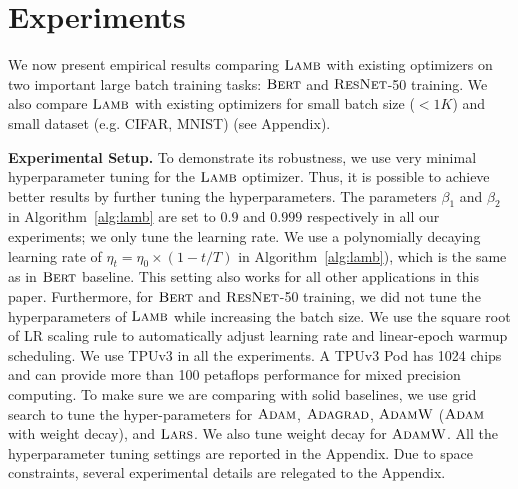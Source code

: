 \documentclass{article} \usepackage{iclr2020_conference,times}
\newcommand{\resnet}{\textsc{ResNet}}
\newcommand{\bert}{\textsc{Bert}\xspace}
\newcommand{\adagrad}{\textsc{Adagrad}}
\newcommand{\adam}{\textsc{Adam}}
\newcommand{\adamw}{\textsc{AdamW}}
\newcommand{\lamb}{\textsc{Lamb}}
\newcommand{\lars}{\textsc{Lars}}
\begin{document}
\section{Experiments}
\label{sec:experiments}
We now present empirical results comparing $\lamb$ with existing optimizers on two important large batch training tasks: $\bert$ and $\resnet$-50 training. 
We also compare $\lamb$ with existing optimizers for small batch size ($<1K$) and small dataset (e.g. CIFAR, MNIST) (see Appendix).

{\bf Experimental Setup. } To demonstrate its robustness, we use very minimal hyperparameter tuning for the $\lamb$ optimizer. Thus, it is possible to achieve better results by further tuning the hyperparameters. The parameters $\beta_1 $ and $\beta_2$ in Algorithm~\ref{alg:lamb} are set to $0.9$ and $0.999$ respectively in all our experiments; we only tune the learning rate. We use a polynomially decaying learning rate of $\eta_t = \eta_0 \times (1 - t/T)$ in Algorithm~\ref{alg:lamb}), which is the same as in $\bert$ baseline. This setting also works for all other applications in this paper.
Furthermore, for $\bert$ and $\resnet$-50  training, we did not tune the hyperparameters of $\lamb$ while increasing the batch size. We use the square root of LR scaling rule to automatically adjust learning rate and linear-epoch warmup scheduling. We use TPUv3 in all the experiments.
A TPUv3 Pod has 1024 chips and can provide more than 100 petaflops performance for mixed precision computing.
To make sure we are comparing with solid baselines, we use grid search to tune the hyper-parameters for 
$\adam$, $\adagrad$, $\adamw$ ($\adam$ with weight decay), and $\lars$. We also tune weight decay for $\adamw$. All the hyperparameter tuning settings are reported in the Appendix. Due to space constraints, several experimental details are relegated to the Appendix.
\end{document}

